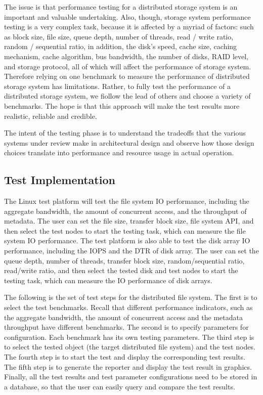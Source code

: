 \documentclass[11pt]{article}
\begin{document}
The issue is that performance testing for a distributed storage system 
is an important and valuable undertaking. Also, though, storage system 
performance testing is a very complex task, because it is affected by 
a myriad of factors: such as block size, file size, queue depth, number 
of threads, read / write ratio, random / sequential ratio, in addition, 
the disk’s speed, cache size, caching mechanism, cache algorithm, bus 
bandwidth, the number of disks, RAID level, and storage protocol, all 
of which will affect the performance of storage system. Therefore 
relying on one benchmark to measure the performance of distributed 
storage system has limitations. Rather, to fully test the performance 
of a distributed storage system, we fiollow the lead of others and 
choose a variety of benchmarks. The hope is that this approach will 
make the test results more realistic, reliable and credible.

The intent of the testing phase is to understand the tradeoffs that 
the various systems under review make in architectural design and 
observe how those design choices translate into performance and 
resource usage in actual operation.

\subsection{Test Implementation}
The Linux test platform will test the file system IO performance, 
including the aggregate bandwidth, the amount of concurrent access, 
and the throughput of metadata. The user can set the file size, 
transfer block size, file system API, and then select the test nodes 
to start the testing task, which can measure the file system IO 
performance. The test platform is also able to test the disk array 
IO performance, including the IOPS and the DTR of disk array. The user 
can set the queue depth, number of threads, transfer block size, 
random/sequential ratio, read/write ratio, and then select the tested 
disk and test nodes to start the testing task, which can measure the 
IO performance of disk arrays.

The following is the set of test steps for the distributed file system.
The first is to select the test benchmarks. Recall that different 
performance indicators, such as the aggregate bandwidth, the amount of 
concurrent access and the metadata throughput have different benchmarks. 
The second is to specify parameters for configuration. Each benchmark 
has its own testing parameters. The third step is to select the tested 
object (the target distributed file system) and the test nodes. The 
fourth step is to start the test and display the corresponding test 
results. The fifth step is to generate the reporter and display the 
test result in graphics. Finally, all the test results and test 
parameter configurations need to be stored in a database, so that the
user can easily query and compare the test results.
\end{document}
